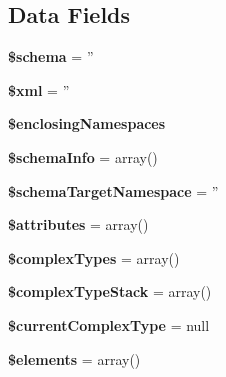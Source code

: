 \subsection*{Data Fields}
\begin{DoxyCompactItemize}
\item 
\hypertarget{class_x_m_l_schema_a83022b1d70799d2bde3d64dca9cb40ee}{{\bfseries \$schema} = ''}\label{class_x_m_l_schema_a83022b1d70799d2bde3d64dca9cb40ee}

\item 
\hypertarget{class_x_m_l_schema_aa108d9d91e700ac530401dd363b0723b}{{\bfseries \$xml} = ''}\label{class_x_m_l_schema_aa108d9d91e700ac530401dd363b0723b}

\item 
\hypertarget{class_x_m_l_schema_a4ed6b922bbc98b7b09a14bbf141e0ada}{{\bfseries \$enclosing\-Namespaces}}\label{class_x_m_l_schema_a4ed6b922bbc98b7b09a14bbf141e0ada}

\item 
\hypertarget{class_x_m_l_schema_a3c87187fdb02d5c69ab1659f5c9a1099}{{\bfseries \$schema\-Info} = array()}\label{class_x_m_l_schema_a3c87187fdb02d5c69ab1659f5c9a1099}

\item 
\hypertarget{class_x_m_l_schema_a0b39c1afa0ee87e3ee1611e3325ad28d}{{\bfseries \$schema\-Target\-Namespace} = ''}\label{class_x_m_l_schema_a0b39c1afa0ee87e3ee1611e3325ad28d}

\item 
\hypertarget{class_x_m_l_schema_adc851f7a62250e75df0490c0280aef4c}{{\bfseries \$attributes} = array()}\label{class_x_m_l_schema_adc851f7a62250e75df0490c0280aef4c}

\item 
\hypertarget{class_x_m_l_schema_acf1dbaf5ad35f659428a61193928b78d}{{\bfseries \$complex\-Types} = array()}\label{class_x_m_l_schema_acf1dbaf5ad35f659428a61193928b78d}

\item 
\hypertarget{class_x_m_l_schema_aa99207ae2f6e513f071e064ed93d6e43}{{\bfseries \$complex\-Type\-Stack} = array()}\label{class_x_m_l_schema_aa99207ae2f6e513f071e064ed93d6e43}

\item 
\hypertarget{class_x_m_l_schema_aaa10b6abe9a98459054311aae8844fab}{{\bfseries \$current\-Complex\-Type} = null}\label{class_x_m_l_schema_aaa10b6abe9a98459054311aae8844fab}

\item 
\hypertarget{class_x_m_l_schema_ad18dd8fbe31b294e2bc4711dcde4548d}{{\bfseries \$elements} = array()}\label{class_x_m_l_schema_ad18dd8fbe31b294e2bc4711dcde4548d}


\end{DoxyCompactItemize}
